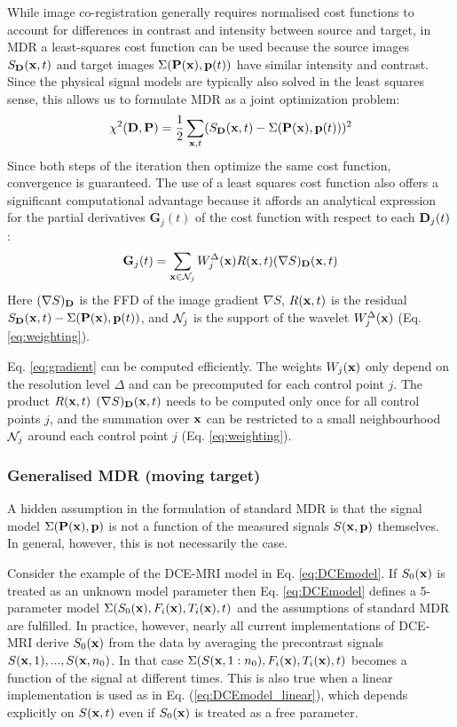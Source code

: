 \documentclass[num-refs]{wiley-article}
\newcommand{\x}{{\bf x}}
\newcommand{\D}{{\bf D}}
\newcommand{\Pb}{{\bf P}}
\newcommand{\pb}{{\bf p}}
\begin{document}
While image co-registration generally requires normalised cost functions to account for differences in contrast and intensity between source and target, in MDR a least-squares cost function can be used because the source images $S_\D(\x, t)$ and target images $\Sigma(\Pb(\x), \pb (t))$ have similar intensity and contrast. Since the physical signal models are typically also solved in the least squares sense, this allows us to formulate MDR as a joint optimization problem:
\begin{equation}\label{eq:mdr std cost}
\chi^2(\D,\Pb)=\frac{1}{2}\sum_{\x, t}(S_\D(\x, t) - \Sigma(\Pb(\x), \pb (t)) )^2 
\end{equation}
Since both steps of the iteration then optimize the same cost function, convergence is guaranteed. The use of a least squares cost function also offers a significant computational advantage because it affords an analytical expression for the partial derivatives $\mathbf{G}_j(t)$ of the cost function with respect to each $\D_j(t)$ \cite{Sorzano2005}:  
\begin{equation}\label{eq:gradient}
\mathbf{G}_j(t)
= \sum_{\x\in {\cal N}_j}  W_j^{\Delta}(\x) R(\x, t) (\nabla S)_\D(\x,t)
\end{equation}
Here $(\nabla S)_\D$ is the FFD of the image gradient $\nabla S$, $R(\x, t)$ is the residual $S_\D(\x, t) - \Sigma(\Pb(\x), \pb (t))$, and ${\cal N}_j$ is the support of the wavelet $W^\Delta_j(\x)$ (Eq. \ref{eq:weighting}).

Eq. \ref{eq:gradient} can be computed efficiently. The weights $W_j(\x)$ only depend on the resolution level $\Delta$ and can be precomputed for each control point $j$. The product $R(\x, t)$ $(\nabla S)_\D(\x, t)$ needs to be computed only once for all control points $j$, and the summation over $\x$ can be restricted to a small neighbourhood ${\cal N}_j$ around each control point $j$ (Eq. \ref{eq:weighting}).

\subsubsection{Generalised MDR (moving target)}

A hidden assumption in the formulation of standard MDR is that the signal model $\Sigma(\Pb(\x), \pb)$ is not a function of the measured signals $S(\x,\pb)$ themselves. In general, however, this is not necessarily the case. 

Consider the example of the DCE-MRI model in Eq. \ref{eq:DCEmodel}. If $S_0(\x)$ is treated as an unknown model parameter then Eq. \ref{eq:DCEmodel} defines a 5-parameter model $\Sigma(S_0(\x), F_i(\x), T_i(\x), t)$ and the assumptions of standard MDR are fulfilled. In practice, however, nearly all current implementations of DCE-MRI derive $S_0(\x)$ from the data by averaging the precontrast signals $S(\x,1), ..., S(\x,n_0)$. In that case $\Sigma(S(\x,1:n_0), F_i(\x), T_i(\x), t)$ becomes a function of the signal at different times. This is also true when a linear implementation is used as in Eq. (\ref{eq:DCEmodel_linear}), which depends explicitly on $S(\x,t)$ even if $S_0(\x)$ is treated as a free parameter.
\end{document}
